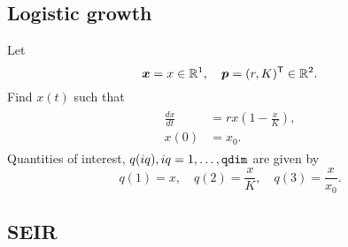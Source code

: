 \documentclass{siamltex}
\newcommand{\pvec}{\bm{p}}
\newcommand{\xvec}{\bm{x}}
\newcommand{\reals}{\mathbb R}
\newcommand{\qdim}{{\tt qdim}}
\newcommand{\nobs}{{\tt nobs}}
\begin{document}
\subsection{Logistic growth}
Let
\begin{equation}
\xvec=x \in \reals^1, \quad \pvec=(r,K)^{\sf T}\in\reals^2.
\end{equation}
Find $x(t)$ such that
\begin{equation}
\begin{gathered}\begin{aligned}
\frac{dx}{dt} &= rx \left( 1-\frac{x}{K} \right), \\
         x(0) &= x_0.
\end{aligned}\end{gathered}
\end{equation}
Quantities of interest, $q(iq),iq=1,\dots,\qdim$ are given by
\begin{equation}
q(1) = x, \quad q(2) = \frac{x}{K}, \quad q(3) = \frac{x}{x_0}.
\end{equation}


\subsection{SEIR}
\end{document}
